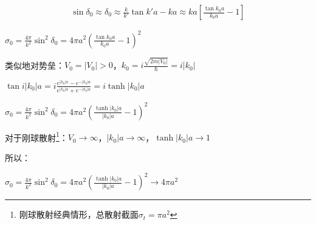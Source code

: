\begin{eqnarray*}
\sin \delta _0  \approx \delta _0  \approx \frac{k}{{k'}}\tan k'a - ka \approx ka\left[ {\frac{{\tan k_0 a}}{{k_0 a}} - 1} \right]
 \end{eqnarray*}

\begin{center}
$\sigma _0  = \frac{{4\pi }}{{k^2 }}\sin ^2 \delta _0  = 4\pi a^2 \left( {\frac{{\tan k_0 a}}{{k_0 a}} - 1} \right)^2$
\end{center}


类似地对势垒：$V_0  = \left| {V_0 } \right| > 0$，$k_0  = i\frac{{\sqrt {2m\left| {V_0 } \right|} }}{\hbar } = i\left| {k_0 } \right|$

$\tan i\left| {k_0 } \right|a = i\frac{{e^{\left| {k_0 } \right|a}  - e^{ - \left| {k_0 } \right|a} }}{{e^{\left| {k_0 } \right|a}  + e^{ - \left| {k_0 } \right|a} }} = i\tanh \left| {k_0 } \right|a$


$\sigma _0  = \frac{{4\pi }}{{k^2 }}\sin ^2 \delta _0  = 4\pi a^2 \left( {\frac{{\tanh \left| {k_0 } \right|a}}{{\left| {k_0 } \right|a}} - 1} \right)^2 $



对于刚球散射\footnote{刚球散射经典情形，总散射截面$\sigma _t  = \pi a^2 $}：$V_0  \to \infty $，$\left| {k_0 } \right|a \to \infty $，$\tanh \left| {k_0 } \right|a \to 1$

所以：

\begin{center}
$\sigma _0  = \frac{{4\pi }}{{k^2 }}\sin ^2 \delta _0  = 4\pi a^2 \left( {\frac{{\tanh \left| {k_0 } \right|a}}{{\left| {k_0 } \right|a}} - 1} \right)^2  \to 4\pi a^2$
\end{center}
